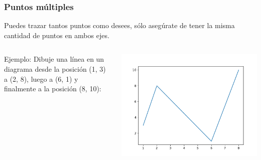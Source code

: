 \begin{frame}[fragile]
  \frametitle{Puntos múltiples}
  Puedes trazar tantos puntos como desees, sólo asegúrate de
  tener la misma cantidad de puntos en ambos ejes.
  \begin{columns}
        \begin{exampleblock}{Ejemplo:}
          Dibuje una línea en un diagrama desde la posición
          (1, 3) a (2, 8), luego a (6, 1) y finalmente a
          la posición (8, 10):
          
        \end{exampleblock}
      \pausa
      \begin{center}
          \includegraphics[scale=0.5]{ejemplos/e04.pdf}
      \end{center}
  \end{columns}
\end{frame}

